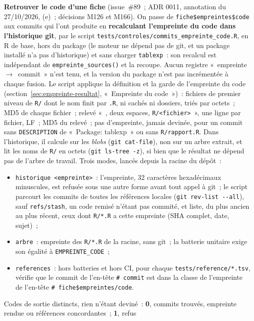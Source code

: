 \documentclass[a4paper,11pt]{article}
\newcommand{\code}[1]{\texttt{\small #1}}
\begin{document}
\medskip
\noindent
\textbf{Retrouver le code d'une fiche} (issue~\#89~; ADR 0011, annotation
du 27/10/2026, (e)~; décisions M126 et M166). On passe de
\code{fiche\$empreintes\$code} aux commits qui l'ont produite en
\textbf{recalculant l'empreinte du code dans l'historique git}, par le
script \code{tests/controles/commits\_empreinte\_code.R}, en R de base,
hors du package (le moteur ne dépend pas de git, et un package installé n'a
pas d'historique) et sans charger \code{tablexp}~: son recalcul est
indépendant de \code{empreinte\_sources()} et la recoupe. Aucun registre
«~empreinte~$\to$~commit~» n'est tenu, et la version du package n'est pas
incrémentée à chaque fusion. Le script applique la définition et la garde
de l'empreinte du code (section~\ref{sec:empreinte-resultat}, «~Empreinte
du code~»)~: fichiers de premier niveau de \code{R/} dont le nom finit par
\code{.R}, ni cachés ni dossiers, triés par octets~; MD5 de chaque
fichier~; relevé «~\code{<md5>}, deux espaces, \code{R/<fichier>}~», une
ligne par fichier, LF~; MD5 du relevé~; pas d'empreinte, jamais devinée,
pour un commit sans \code{DESCRIPTION} de «~Package: tablexp~» ou sans
\code{R/rapport.R}. Dans l'historique, il calcule sur les \emph{blobs}
(\code{git cat-file}), non sur un arbre extrait, et lit les noms de
\code{R/} en octets (\code{git ls-tree -z}), si bien que le résultat ne
dépend pas de l'arbre de travail. Trois modes, lancés depuis la racine du
dépôt~:
\begin{itemize}[leftmargin=*, itemsep=2pt]
  \item \code{historique <empreinte>}~: l'empreinte, 32 caractères
    hexadécimaux minuscules, est refusée sous une autre forme avant tout
    appel à git~; le script parcourt les commits de toutes les références
    locales (\code{git rev-list -{}-all}), sauf \code{refs/stash}, un code
    remisé n'étant pas commité, et liste, du plus ancien au plus récent,
    ceux dont \code{R/*.R} a cette empreinte (SHA complet, date, sujet)~;
  \item \code{arbre}~: empreinte des \code{R/*.R} de la racine, sans git~;
    la batterie unitaire exige son égalité à \code{EMPREINTE\_CODE}~;
  \item \code{references}~: hors batteries et hors CI, pour chaque
    \code{tests/reference/*.tsv}, vérifie que le commit de l'en-tête
    \code{\# commit} est dans la classe de l'empreinte de l'en-tête
    \code{\# fiche\$empreintes/code}.
\end{itemize}
Codes de sortie distincts, rien n'étant deviné~: \textbf{0}, commits
trouvés, empreinte rendue ou références concordantes~; \textbf{1}, refus
\end{document}
